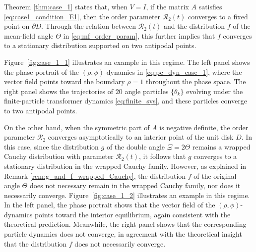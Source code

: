\documentclass[10pt]{article}
\theoremstyle{definition}
\theoremstyle{definition}
\numberwithin{equation}{section}
\newcommand{\CR}{\mathcal{R}}
\begin{document}
Theorem \ref{thm:case_1} states that, when $V = I$, if the matrix $A$ satisfies \eqref{eq:case1_condition_E1}, then the order parameter $\CR_2(t)$ converges to a fixed point on $\partial D$.
Through the relation between $\CR_2(t)$ and the distribution $f$ of the mean-field angle $\Theta$ in \eqref{eq:mf_order_param}, this further implies that $f$ converges to a stationary distribution supported on two antipodal points.

Figure~\ref{fig:case_1_1} illustrates an example in this regime.
The left panel shows the phase portrait of the $(\rho, \phi)$-dynamics in \eqref{eq:pc_dyn_case_1}, 
where the vector field points toward the boundary $\rho = 1$ throughout the phase space.
The right panel shows the trajectories of $20$ angle particles $\{\theta_k\}$ evolving under the finite-particle transformer dynamics \eqref{eq:finite_sys}, and these particles converge to two antipodal points.

On the other hand, when the symmetric part of $A$ is negative definite, the order parameter $\CR_2$ converges asymptotically to an interior point of the unit disk $D$.
In this case, since the distribution $g$ of the double angle $\Xi = 2\Theta$ remains a wrapped Cauchy distribution with parameter $\CR_2(t)$, it follows that $g$ converges to a stationary distribution in the wrapped Cauchy family.
However, as explained in Remark \ref{rem:g_and_f_wrapped_Cauchy}, the distribution $f$ of the original angle $\Theta$ does not necessary remain in the wrapped Cauchy family, nor does it necessarily converge. Figure~\ref{fig:case_1_2} illustrates an example in this regime.
In the left panel, the phase portrait shows that the vector field of the $(\rho, \phi)$-dynamics points toward the interior equilibrium, again consistent with the theoretical prediction.
Meanwhile, the right panel shows that the corresponding particle dynamics does not converge, in agreement with the theoretical insight that the distribution $f$ does not necessarily converge.

\end{document}
